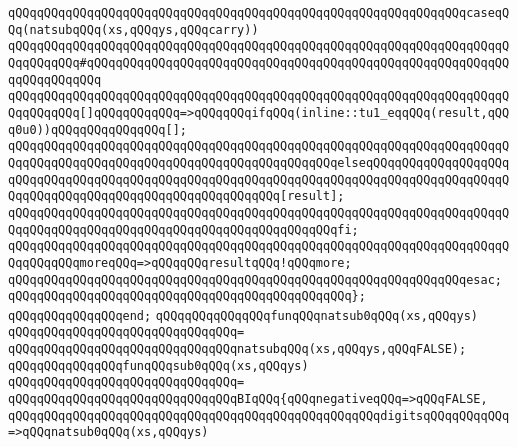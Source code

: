 \newline
\verb|qQQqqQQqqQQqqQQqqQQqqQQqqQQqqQQqqQQqqQQqqQQqqQQqqQQqqQQqqQQqqQQqcaseqQQq(natsubqQQq(xs,qQQqys,qQQqcarry))|\newline
\verb|qQQqqQQqqQQqqQQqqQQqqQQqqQQqqQQqqQQqqQQqqQQqqQQqqQQqqQQqqQQqqQQqqQQqqQQqqQQqqQQq#qQQqqQQqqQQqqQQqqQQqqQQqqQQqqQQqqQQqqQQqqQQqqQQqqQQqqQQqqQQqqQQqqQQqqQQq|\newline
\verb|qQQqqQQqqQQqqQQqqQQqqQQqqQQqqQQqqQQqqQQqqQQqqQQqqQQqqQQqqQQqqQQqqQQqqQQqqQQqqQQq[]qQQqqQQqqQQq=>qQQqqQQqifqQQq(inline::tu1_eqqQQq(result,qQQq0u0))qQQqqQQqqQQqqQQq[];|\newline
\verb|qQQqqQQqqQQqqQQqqQQqqQQqqQQqqQQqqQQqqQQqqQQqqQQqqQQqqQQqqQQqqQQqqQQqqQQqqQQqqQQqqQQqqQQqqQQqqQQqqQQqqQQqqQQqqQQqqQQqelseqQQqqQQqqQQqqQQqqQQqqQQqqQQqqQQqqQQqqQQqqQQqqQQqqQQqqQQqqQQqqQQqqQQqqQQqqQQqqQQqqQQqqQQqqQQqqQQqqQQqqQQqqQQqqQQqqQQqqQQqqQQqqQQq[result];|\newline
\verb|qQQqqQQqqQQqqQQqqQQqqQQqqQQqqQQqqQQqqQQqqQQqqQQqqQQqqQQqqQQqqQQqqQQqqQQqqQQqqQQqqQQqqQQqqQQqqQQqqQQqqQQqqQQqqQQqqQQqfi;|\newline
\newline
\verb|qQQqqQQqqQQqqQQqqQQqqQQqqQQqqQQqqQQqqQQqqQQqqQQqqQQqqQQqqQQqqQQqqQQqqQQqqQQqqQQqmoreqQQq=>qQQqqQQqresultqQQq!qQQqmore;|\newline
\verb|qQQqqQQqqQQqqQQqqQQqqQQqqQQqqQQqqQQqqQQqqQQqqQQqqQQqqQQqqQQqqQQqesac;|\newline
\verb|qQQqqQQqqQQqqQQqqQQqqQQqqQQqqQQqqQQqqQQqqQQqqQQq};|\newline
\verb|qQQqqQQqqQQqqQQqend;|\newline
\newline
\newline
\newline
\verb|qQQqqQQqqQQqqQQqfunqQQqnatsub0qQQq(xs,qQQqys)|\newline
\verb|qQQqqQQqqQQqqQQqqQQqqQQqqQQqqQQq=|\newline
\verb|qQQqqQQqqQQqqQQqqQQqqQQqqQQqqQQqnatsubqQQq(xs,qQQqys,qQQqFALSE);|\newline
\newline
\newline
\newline
\verb|qQQqqQQqqQQqqQQqfunqQQqsub0qQQq(xs,qQQqys)|\newline
\verb|qQQqqQQqqQQqqQQqqQQqqQQqqQQqqQQq=|\newline
\verb|qQQqqQQqqQQqqQQqqQQqqQQqqQQqqQQqBIqQQq{qQQqnegativeqQQq=>qQQqFALSE,|\newline
\verb|qQQqqQQqqQQqqQQqqQQqqQQqqQQqqQQqqQQqqQQqqQQqqQQqqQQqdigitsqQQqqQQqqQQq=>qQQqnatsub0qQQq(xs,qQQqys)|\newline
